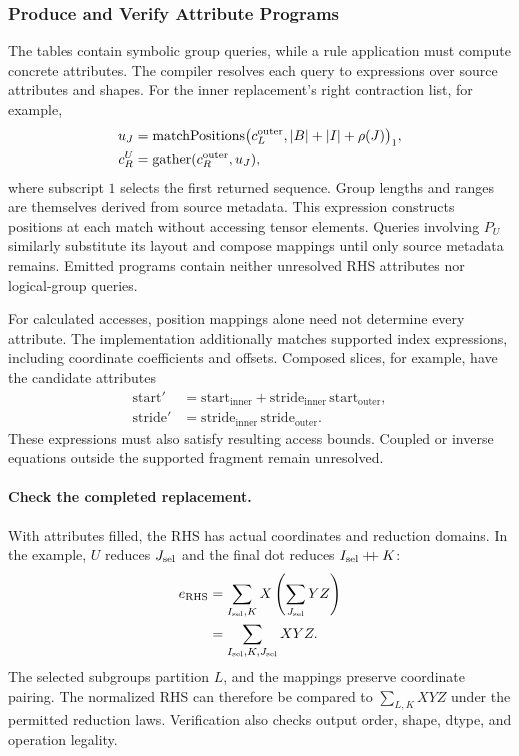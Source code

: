 \subsubsection{Produce and Verify Attribute Programs}
\label{sec:emit-programs}
The tables contain symbolic group queries, while a rule application must
compute concrete attributes. The compiler resolves each query to expressions
over source attributes and shapes. For the inner replacement's right
contraction list, for example,
\begin{equation}
\begin{aligned}
 u_J&=\operatorname{matchPositions}\bigl(c_L^{\mathrm{outer}},
                   |B|+|I|+\rho(J)\bigr)_1,\\
 c_R^U&=\operatorname{gather}(c_R^{\mathrm{outer}},u_J),
\end{aligned}
\label{eq:source-only-example}
\end{equation}
where subscript $1$ selects the first returned sequence. Group lengths and
ranges are themselves derived from source metadata. This expression constructs
positions at each match without accessing tensor elements. Queries involving
$P_U$ similarly substitute its layout and compose mappings until only source
metadata remains. Emitted programs contain neither unresolved RHS attributes
nor logical-group queries.

For calculated accesses, position mappings alone need not determine every
attribute. The implementation additionally matches supported index expressions,
including coordinate coefficients and offsets. Composed slices, for example,
have the candidate attributes
\begin{equation}
\begin{aligned}
 \mathrm{start}'&=\mathrm{start}_{\mathrm{inner}}
   +\mathrm{stride}_{\mathrm{inner}}\,\mathrm{start}_{\mathrm{outer}},\\
 \mathrm{stride}'&=\mathrm{stride}_{\mathrm{inner}}\,
                  \mathrm{stride}_{\mathrm{outer}}.
\end{aligned}
\end{equation}
These expressions must also satisfy resulting access bounds. Coupled or
inverse equations outside the supported fragment remain unresolved.

\paragraph{Check the completed replacement.}
With attributes filled, the RHS has actual coordinates and reduction domains.
In the example, $U$ reduces $J_{\mathrm{sel}}$ and the final dot reduces
$I_{\mathrm{sel}}\mathbin{+\!\!+} K$:
\begin{equation}
\begin{aligned}
 e_{\mathrm{RHS}}
 &=\sum_{I_{\mathrm{sel}},K}X\left(\sum_{J_{\mathrm{sel}}}YZ\right)\\
 &=\sum_{I_{\mathrm{sel}},K,J_{\mathrm{sel}}}XYZ.
\end{aligned}
\end{equation}
The selected subgroups partition $L$, and the mappings preserve coordinate
pairing. The normalized RHS can therefore be compared to
$\sum_{L,K}XYZ$ under the permitted reduction laws. Verification also checks
output order, shape, dtype, and operation legality.

